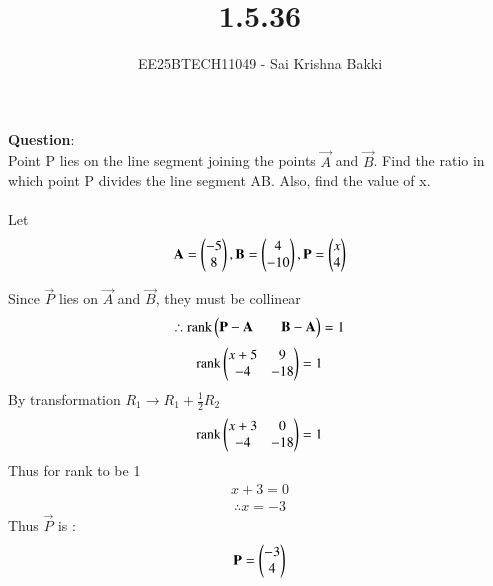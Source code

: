 \documentclass[journal]{IEEEtran}
\begin{document}

\vspace{3cm}

\title{1.5.36}
\author{EE25BTECH11049 - Sai Krishna Bakki}
 \maketitle
{\let\newpage\relax\maketitle}

\renewcommand{\thefigure}{\theenumi}
\renewcommand{\thetable}{\theenumi}
\setlength{\intextsep}{10pt} %


\renewcommand{\thetable}{\theenumi}

\textbf{Question}:\\
Point P lies on the line segment joining the points $\vec{A}$ and $\vec{B}$. Find the ratio in which point P divides the line segment AB. Also, find the value of x. \\ 
\solution \\
Let 
\begin{align}
\mathbf{A}= \begin{pmatrix}-5 \\ 8\end{pmatrix}, \mathbf{B}= \begin{pmatrix}4 \\ -10\end{pmatrix} , \mathbf{P} = \begin{pmatrix}x \\ 4\end{pmatrix}
\end{align}    

Since $\vec{P}$ lies on $\vec{A}$ and $\vec{B}$, they must be collinear
\begin{align}
\therefore \text{rank}\begin{pmatrix}\mathbf{P} - \mathbf{A} & &\mathbf{B} - \mathbf{A}\end{pmatrix} = 1
\end{align}
\begin{align}
    \text{rank}\begin{pmatrix}x+5 & 9 \\ -4 & -18\end{pmatrix} = 1
\end{align}
By transformation $R_1 \rightarrow R_1 + \frac{1}{2}R_2$
\begin{align}
    \text{rank}\begin{pmatrix}x+3 & 0 \\ -4 & -18\end{pmatrix} = 1
\end{align}
Thus for rank to be 1
\begin{align}
    x+3 = 0
\end{align}
\begin{align}
\therefore x = -3
\end{align}
Thus $\vec{P}$ is :
\begin{align}
    \mathbf{P} = \begin{pmatrix}-3 \\ 4\end{pmatrix}
\end{align}
\end{document}
